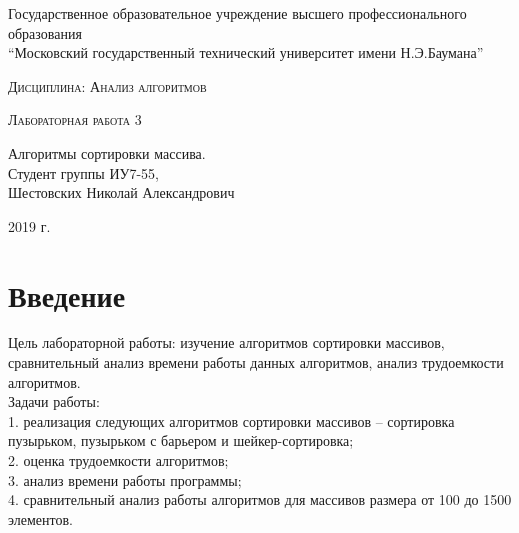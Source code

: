 \documentclass[a4paper, 14pt]{article}
\begin{document}
    \begin{titlepage}

        \begin{center}
            \large
            Государственное образовательное учреждение высшего профессионального образования\\
            “Московский государственный технический университет имени Н.Э.Баумана”
            \vspace{3cm}
            
            \textsc{Дисциплина: Анализ алгоритмов}
            \vspace{0.5cm}
                
            \textsc{Лабораторная работа 3}
            \vspace{1.5cm}
            
            {\LARGE Алгоритмы сортировки массива.\\}
            \vspace{1.5cm}
            Студент группы ИУ7-55,\\   
            Шестовских Николай Александрович
            \vfill
            
            2019 г.
            
            \end{center}

    \end{titlepage}
    
\tableofcontents
	\setcounter{page}{2}
	\newpage
	
        \section*{Введение}
        Цель лабораторной работы: изучение алгоритмов сортировки массивов, сравнительный анализ времени работы данных алгоритмов, анализ трудоемкости алгоритмов.\\
Задачи работы:\\
1. реализация следующих алгоритмов сортировки массивов –  сортировка пузырьком, пузырьком с барьером и шейкер-сортировка;\\
2. оценка трудоемкости алгоритмов;\\
3. анализ времени работы программы;\\
4. сравнительный анализ работы алгоритмов для массивов размера от 100 до 1500 элементов.

        \parindent=1cm
		
\end{document}
